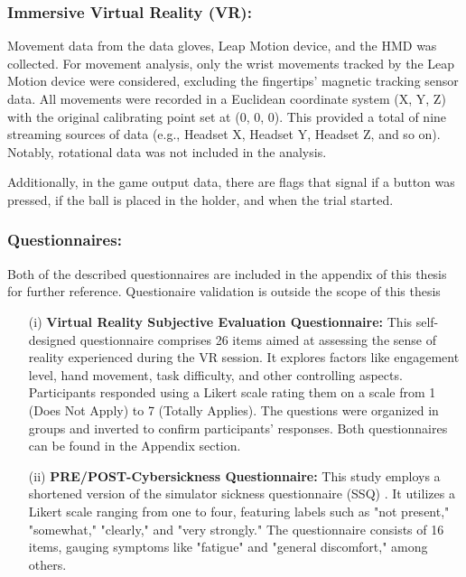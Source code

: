 \documentclass[12pt,oneside,openright]{report}
\begin{document}
\subsubsection*{Immersive Virtual Reality (VR):}

Movement data from the data gloves, Leap Motion device, and the HMD was collected. For movement analysis, only the wrist movements tracked by the Leap Motion device were considered, excluding the fingertips' magnetic tracking sensor data. All movements were recorded in a Euclidean coordinate system (X, Y, Z) with the original calibrating point set at (0, 0, 0). This provided a total of nine streaming sources of data (e.g., Headset X, Headset Y, Headset Z, and so on). Notably, rotational data was not included in the analysis.

Additionally, in the game output data, there are flags that signal if a button was pressed, if the ball is placed in the holder, and when the trial started.

\subsubsection*{Questionnaires:}
Both of the described questionnaires are included in the appendix of this thesis for further reference. Questionaire validation is outside the scope of this thesis

\begin{enumerate}
\item[(i)] \textbf{Virtual Reality Subjective Evaluation Questionnaire:} This self-designed questionnaire comprises 26 items aimed at assessing the sense of reality experienced during the VR session. It explores factors like engagement level, hand movement, task difficulty, and other controlling aspects. Participants responded using a Likert scale rating them on a scale from 1 (Does Not Apply) to 7 (Totally Applies). The questions were organized in groups and inverted to confirm participants' responses. Both questionnaires can be found in the Appendix section.

\item[(ii)] \textbf{PRE/POST-Cybersickness Questionnaire:} This study employs a shortened version of the simulator sickness questionnaire (SSQ) \parencite*{avpsy}. It utilizes a Likert scale ranging from one to four, featuring labels such as "not present," "somewhat," "clearly," and "very strongly." The questionnaire consists of 16 items, gauging symptoms like "fatigue" and "general discomfort," among others.
\end{enumerate}
\end{document}
